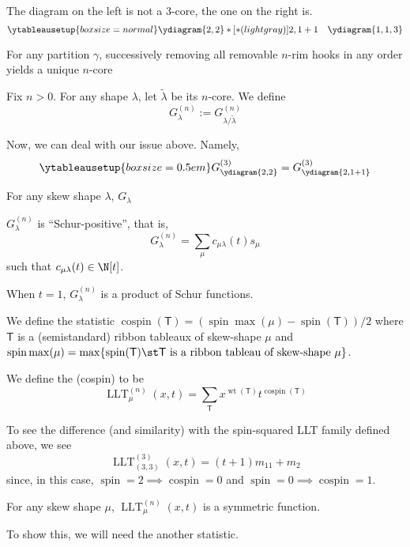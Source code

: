 \documentclass[11pt,leqno,oneside]{amsart}
\numberwithin{thm}{section}
\newcommand{\T}{\mathsf{T}} %
\newcommand{\spin}{\operatorname{spin}}
\newcommand{\cospin}{\operatorname{cospin}}
\newcommand{\wt}{\operatorname{wt}}
\newcommand{\LLT}{\operatorname{LLT}}
\begin{document}
\begin{example}
  The diagram on the left is not a \(3\)-core, the one on the right is.
  \[
    \ytableausetup{boxsize=normal} \ydiagram{2,2}*[*(lightgray)]{2,1+1} \ \ \ \ydiagram{1,1,3}
  \]
\end{example}
\begin{prop}
  For any partition \(\gamma\), successively removing all removable
  \(n\)-rim hooks in any order yields a unique \(n\)-core
\end{prop}
\begin{defn}
  Fix \(n > 0\). For any shape \(\lambda\), let \(\tilde{\lambda}\) be
  its \(n\)-core. We define \[
    G_\lambda^{(n)} := G_{\lambda/\tilde{\lambda}}^{(n)}
  \]
\end{defn}
\begin{example}
  Now, we can deal with our issue above. Namely, \[
  \ytableausetup{boxsize=0.5em}G_{\ydiagram{2,2}}^{(3)} = G_{\ydiagram{2,1+1}}^{(3)}
  \]
\end{example}
\begin{prop}
  For any skew shape \(\lambda\), \(G_\lambda\)
\end{prop}
\begin{prop}
  \(G_\lambda^{(n)}\) is ``Schur-positive'', that is, \[
    G_\lambda^{(n)} = \sum_\mu c_{\mu \lambda}(t) s_\mu
  \]
  such that \(c_{\mu \lambda}(t) \in \N[t]\). 
\end{prop}
\begin{prop}
  When \(t=1\), \(G_\lambda^{(n)}\) is a product of Schur functions.
\end{prop}
\begin{defn}
  We define the statistic \(\cospin(\T) = (\spin\max(\mu) -
  \spin(\T))/2\) where \(\T\) is a (semistandard) ribbon tableaux of
  skew-shape \(\mu\) and \(\spin\max(\mu) = \max\{\spin(\T) \st \T
  \text{ is a ribbon tableau of skew-shape }\mu\}\).
\end{defn}
\begin{defn}
  We define the (cospin)  to be \[
    \LLT_\mu^{(n)}(x,t) = \sum_{\T} x^{\wt(\T)} t^{\cospin(\T)}
  \]
\end{defn}
\begin{example}
  To see the difference (and similarity) with the spin-squared LLT family defined
  above, we see \[
    \LLT_{(3,3)}^{(3)}(x,t) = (t+1)m_{11} + m_2
  \]
  since, in this case, \(\spin = 2 \implies \cospin = 0\) and \(\spin
  = 0 \implies \cospin = 1\).
\end{example}
\begin{prop}
  For any skew shape \(\mu\), \(\LLT_\mu^{(n)}(x,t)\) is a symmetric
  function. 
\end{prop}
To show this, we will need the another statistic.
\end{document}
